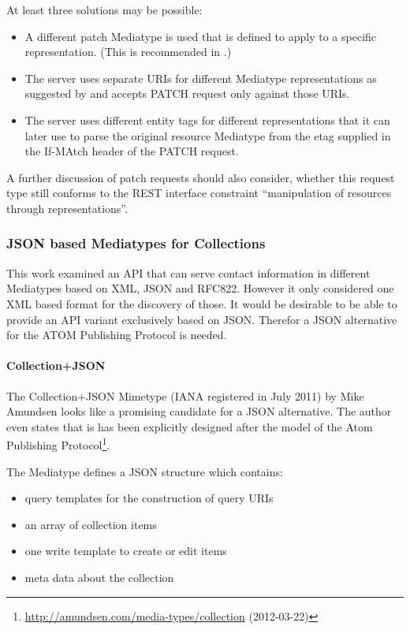 \documentclass[11pt,a4paper,headsepline,twoside]{scrartcl}		%
\newcommand{\citeurl}[2]{\url{#1} (#2)}
\begin{document}
At least three solutions may be possible:
\begin{itemize}
\item A different patch Mediatype is used that is defined to apply to a specific
  representation. (This is recommended in \cite[ch. 11.9]{Allamaraju_2010}.)
\item The server uses separate URIs for different Mediatype representations as
  suggested by \cite{Raman2006} and accepts PATCH request only against those
  URIs.
\item The server uses different entity tags for different representations that
  it can later use to parse the original resource Mediatype from the etag
  supplied in the If-MAtch header of the PATCH request.
\end{itemize}

A further discussion of patch requests should also consider, whether this
request type still conforms to the REST interface constraint ``manipulation of
resources through representations''\cite[sec. 5.1.5]{Fielding2000}.

\subsubsection{JSON based Mediatypes for Collections}
\label{sec:media-types-coll}

This work examined an API that can serve contact information in different
Mediatypes based on XML, JSON and RFC822. However it only considered one XML
based format for the discovery of those. It would be desirable to be able to
provide an API variant exclusively based on JSON. Therefor a JSON alternative
for the ATOM Publishing Protocol is needed.

\paragraph{Collection+JSON}
\label{sec:collection+json}

The Collection+JSON Mimetype (IANA registered in July 2011) by Mike
Amundsen \cite{Amundsen2011a}\cite[ch. 3]{amundsen2011building} looks like a
promising candidate for a JSON alternative. The author even states that is has
been explicitly designed after the model of the Atom Publishing
Protocol\footnote{\citeurl{http://amundsen.com/media-types/collection}{2012-03-22}}.

The Mediatype defines a JSON structure which contains:

\begin{itemize}
\item query templates for the construction of query URIs
\item an array of collection items
\item one write template to create or edit items
\item meta data about the collection
\end{itemize}
\end{document}
